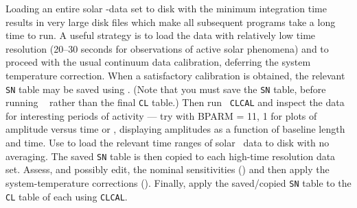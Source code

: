      Loading an entire solar \uv-data set to disk with the minimum
integration time results in very large disk files which make all
subsequent programs take a long time to run.  A useful strategy is to
load the data with relatively low time resolution (20--30 seconds for
observations of active solar phenomena) and to proceed with the usual
continuum data calibration, deferring the system temperature
correction.  When a satisfactory calibration is obtained, the relevant
{\tt SN} table may be saved using \hbox{{\tt {}}}.  (Note
that you must save the {\tt SN} table, before running {\tt
{}} rather than the final {\tt CL} table.)  Then run {\tt
CLCAL} and inspect the data for interesting periods of activity ---
try {\tt {}} with {\us BPARM = 11, 1} for plots of amplitude
versus time or {\tt {}}, displaying amplitudes as a function
of baseline length and time.  Use {\tt {}} to load the
relevant time ranges of solar \uv\ data to disk with no averaging.
The saved {\tt SN} table is then copied to each high-time resolution
data set.  Assess, and possibly edit, the nominal sensitivities
() and then apply the system-temperature corrections
().  Finally, apply the saved/copied {\tt SN} table to
the {\tt CL} table of each using \hbox{{\tt CLCAL}}.


